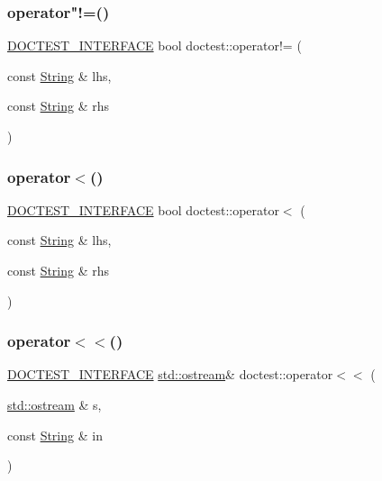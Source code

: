 \mbox{\label{namespacedoctest_ab9a88e4c19857cd86a0f037d27bcad72}} 
\subsubsection{\texorpdfstring{operator"!=()}{operator!=()}}
{\footnotesize\ttfamily \hyperlink{doctest_8h_a9c16ffc635ec47f07797d21ede26b1a5}{D\+O\+C\+T\+E\+S\+T\+\_\+\+I\+N\+T\+E\+R\+F\+A\+CE} bool doctest\+::operator!= (\begin{DoxyParamCaption}\item[{const \hyperlink{classdoctest_1_1String}{String} \&}]{lhs,  }\item[{const \hyperlink{classdoctest_1_1String}{String} \&}]{rhs }\end{DoxyParamCaption})}

\mbox{\label{namespacedoctest_afa15b277b9a277793b7adf129e0128d9}} 
\subsubsection{\texorpdfstring{operator$<$()}{operator<()}}
{\footnotesize\ttfamily \hyperlink{doctest_8h_a9c16ffc635ec47f07797d21ede26b1a5}{D\+O\+C\+T\+E\+S\+T\+\_\+\+I\+N\+T\+E\+R\+F\+A\+CE} bool doctest\+::operator$<$ (\begin{DoxyParamCaption}\item[{const \hyperlink{classdoctest_1_1String}{String} \&}]{lhs,  }\item[{const \hyperlink{classdoctest_1_1String}{String} \&}]{rhs }\end{DoxyParamCaption})}

\mbox{\label{namespacedoctest_a44abf00f713df05b4185eda7403268b7}} 
\subsubsection{\texorpdfstring{operator$<$$<$()}{operator<<()}}
{\footnotesize\ttfamily \hyperlink{doctest_8h_a9c16ffc635ec47f07797d21ede26b1a5}{D\+O\+C\+T\+E\+S\+T\+\_\+\+I\+N\+T\+E\+R\+F\+A\+CE} \hyperlink{doctest_8h_a116af65cb5e924b33ad9d9ecd7a783f3}{std\+::ostream}\& doctest\+::operator$<$$<$ (\begin{DoxyParamCaption}\item[{\hyperlink{doctest_8h_a116af65cb5e924b33ad9d9ecd7a783f3}{std\+::ostream} \&}]{s,  }\item[{const \hyperlink{classdoctest_1_1String}{String} \&}]{in }\end{DoxyParamCaption})}

